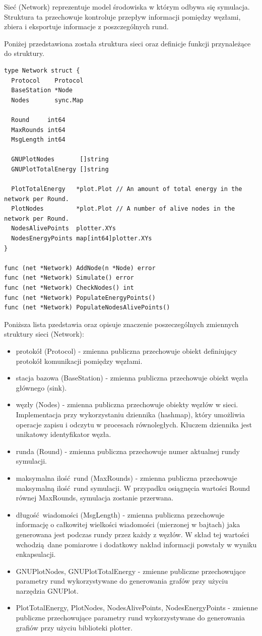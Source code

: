 \documentclass[a4paper,12pt,twoside,openany]{report}
\begin{document}
Sieć (Network) reprezentuje model środowiska w którym odbywa się symulacja. Struktura ta przechowuje kontroluje przepływ informacji pomiędzy węzłami,
zbiera i eksportuje informacje z poszczególnych rund.

Poniżej przedstawiona została struktura sieci oraz definicje funkcji przynależące do struktury.

\begin{lstlisting}
type Network struct {
  Protocol    Protocol
  BaseStation *Node
  Nodes       sync.Map

  Round     int64
  MaxRounds int64
  MsgLength int64

  GNUPlotNodes       []string
  GNUPlotTotalEnergy []string

  PlotTotalEnergy   *plot.Plot // An amount of total energy in the network per Round.
  PlotNodes         *plot.Plot // A number of alive nodes in the network per Round.
  NodesAlivePoints  plotter.XYs
  NodesEnergyPoints map[int64]plotter.XYs
}

func (net *Network) AddNode(n *Node) error
func (net *Network) Simulate() error
func (net *Network) CheckNodes() int
func (net *Network) PopulateEnergyPoints()
func (net *Network) PopulateNodesAlivePoints()
\end{lstlisting}

Poniższa lista pzedstawia oraz opisuje znaczenie poszeczególnych zmiennych struktury sieci (Network):

\begin{itemize}
 \item protokół (Protocol) - zmienna publiczna przechowuje obiekt definiujący protokół komunikacji pomiędzy węzłami.
 \item stacja bazowa (BaseStation) - zmienna publiczna przechowuje obiekt węzła głównego (sink).
 \item węzły (Nodes) - zmienna publiczna przechowuje obiekty węzłów w sieci. Implementacja przy wykorzystaniu dziennika (hashmap), 
       który umożliwia operacje zapisu i odczytu w procesach równoległych. Kluczem dziennika jest unikatowy identyfikator węzła.
 \item runda (Round) - zmienna publiczna przechowuje numer aktualnej rundy symulacji.
 \item maksymalna ilość rund (MaxRounds) - zmienna publiczna przechowuje maksymalną ilość rund symulacji. 
       W przypadku osiągnęcia wartości Round równej MaxRounds, symulacja zostanie przerwana.
 \item długość wiadomości (MsgLength) - zmienna publiczna przechowuje informację o całkowitej wielkości wiadomości (mierzonej w bajtach) jaka generowana
       jest podczas rundy przez każdy z węzłów. W skład tej wartości wchodzią dane pomiarowe i dodatkowy nakład informacji powstały w wyniku enkapsulacji.
 \item GNUPlotNodes, GNUPlotTotalEnergy - zmienne publiczne przechowujące parametry rund wykorzystywane do generowania grafów przy użyciu narzędzia GNUPlot.
 \item PlotTotalEnergy, PlotNodes, NodesAlivePoints, NodesEnergyPoints - zmienne publiczne przechowujące parametry rund wykorzystywane do generowania grafiów
       przy użyciu biblioteki plotter.
\end{itemize}
\end{document}
